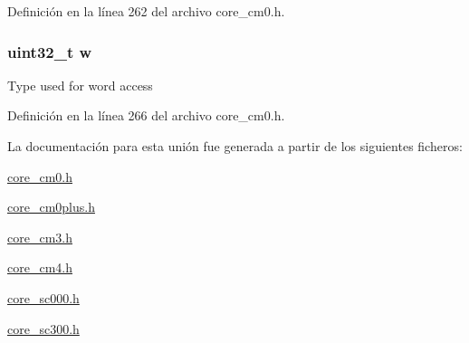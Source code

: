 Definición en la línea 262 del archivo core\+\_\+cm0.\+h.

\subsubsection[{\texorpdfstring{w}{w}}]{\setlength{\rightskip}{0pt plus 5cm}uint32\+\_\+t w}\hypertarget{union_c_o_n_t_r_o_l___type_ad0fb62e7a08e70fc5e0a76b67809f84b}{}\label{union_c_o_n_t_r_o_l___type_ad0fb62e7a08e70fc5e0a76b67809f84b}
Type used for word access 

Definición en la línea 266 del archivo core\+\_\+cm0.\+h.



La documentación para esta unión fue generada a partir de los siguientes ficheros\+:\begin{DoxyCompactItemize}
\item 
\hyperlink{core__cm0_8h}{core\+\_\+cm0.\+h}\item 
\hyperlink{core__cm0plus_8h}{core\+\_\+cm0plus.\+h}\item 
\hyperlink{core__cm3_8h}{core\+\_\+cm3.\+h}\item 
\hyperlink{core__cm4_8h}{core\+\_\+cm4.\+h}\item 
\hyperlink{core__sc000_8h}{core\+\_\+sc000.\+h}\item 
\hyperlink{core__sc300_8h}{core\+\_\+sc300.\+h}\end{DoxyCompactItemize}
